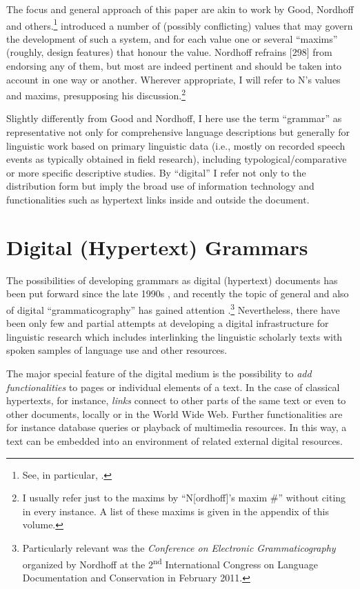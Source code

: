 The focus and general approach of this paper are akin to work by Good, Nordhoff and others.\footnote{See, 
 in particular, \citet{Good2004,GoodEtAl2010,Nordhoff2007tgasg,Nordhoff2007gwea,Nordhoff2007ggwg}.
} 
\citet{Nordhoff2008} introduced a number of (possibly conflicting) values that may govern the development of such a system, and for each value one or several ``maxims'' (roughly, design features) that honour the value. 
Nordhoff refrains [298] from endorsing any of them, but most are indeed pertinent and should be taken into account in one way or another. Wherever appropriate, I will refer to N's values and maxims, presupposing his discussion.\footnote{I 
 usually refer just to the maxims by ``N[ordhoff]'s maxim \#'' without citing \citet{Nordhoff2008} in every instance. A
 list of these maxims is given in the appendix of this volume.
}

Slightly differently from Good and Nordhoff, I here use the term ``grammar'' as representative not only for comprehensive language descriptions but generally for linguistic work based on primary linguistic data (i.e., mostly on recorded speech events as typically obtained in field research), including typological/comparative or more specific descriptive studies. By ``digital'' I refer not only to the distribution form but imply the broad use of information technology and functionalities such as hypertext links inside and outside the document.

\section{Digital (Hypertext) Grammars}  \label{drude:sec:2}
The possibilities of developing grammars as digital (hypertext) documents has been put forward since the late 1990s \citep{Zaefferer1998}, and recently the topic of general and also of digital ``grammaticography'' has gained attention \citep{AmekaEtAlEd2006,Lehmann2004dog,Lehmann2004fg,PayneEtAlEd2007}.\footnote{Particularly 
 relevant was the \textit{Conference on Electronic Grammaticography} organized by Nordhoff at the 2\textsuperscript{nd} International Congress on Language Documentation and Conservation in February 2011.
} 
Nevertheless, there have been only few and partial attempts at developing a digital infrastructure for linguistic research which includes interlinking the linguistic scholarly texts with spoken samples of language use and other resources.

The major special feature of the digital medium is the possibility to \textit{add functionalities} to pages or individual elements of a text. In the case of classical hypertexts, for instance, \textit{links} connect to other parts of the same text or even to other documents, locally or in the World Wide Web. Further functionalities are for instance database queries or playback of multimedia resources. In this way, a text can be embedded into an environment of related external digital resources.

